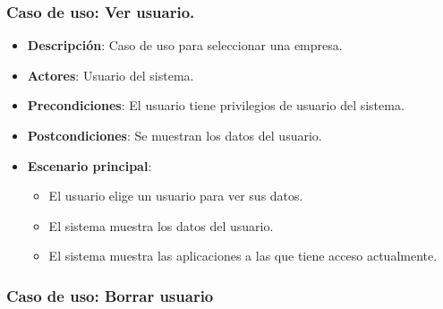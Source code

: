 \documentclass[12pt,a4paperpaper,]{report}
\providecommand{\tightlist}{%
  \setlength{\itemsep}{0pt}\setlength{\parskip}{0pt}}
\begin{document}
\subsubsection{Caso de uso: Ver
usuario.}\label{caso-de-uso-ver-usuario.}

\begin{itemize}
\tightlist
\item
  \textbf{Descripción}: Caso de uso para seleccionar una empresa.
\item
  \textbf{Actores}: Usuario del sistema.
\item
  \textbf{Precondiciones}: El usuario tiene privilegios de usuario del
  sistema.
\item
  \textbf{Postcondiciones}: Se muestran los datos del usuario.
\item
  \textbf{Escenario principal}:

  \begin{itemize}
  \tightlist
  \item
    El usuario elige un usuario para ver sus datos.
  \item
    El sistema muestra los datos del usuario.
  \item
    El sistema muestra las aplicaciones a las que tiene acceso
    actualmente.
  \end{itemize}
\end{itemize}

\subsubsection{Caso de uso: Borrar
usuario}\label{caso-de-uso-borrar-usuario}
\end{document}
